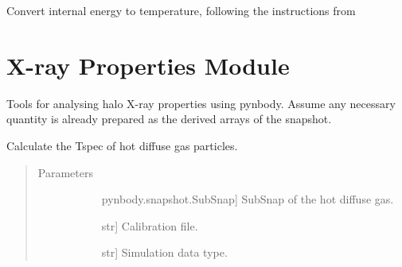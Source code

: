 \documentclass[letterpaper,10pt,english]{sphinxmanual}
\begin{document}

\begin{fulllineitems}
\label{\detokenize{gas_properties:modules.gas_properties.temp}}
Convert internal energy to temperature, following 
the instructions from 

\end{fulllineitems}



\section{X-ray Properties Module}
\label{\detokenize{X_properties:module-modules.X_properties}}\label{\detokenize{X_properties:x-ray-properties-module}}\label{\detokenize{X_properties::doc}}
Tools for analysing halo X-ray properties using pynbody.
Assume any necessary quantity is already prepared as 
the derived arrays of the snapshot.

\begin{fulllineitems}
\label{\detokenize{X_properties:modules.X_properties.cal_tspec}}
Calculate the Tspec of hot diffuse gas particles.
\begin{quote}\begin{description}
\item[{Parameters}] \leavevmode\begin{description}
\item[{}] \leavevmode{[}pynbody.snapshot.SubSnap{]}
SubSnap of the hot diffuse gas.

\item[{}] \leavevmode{[}str{]}
Calibration file.

\item[{}] \leavevmode{[}str{]}
Simulation data type.

\end{description}

\end{description}\end{quote}

\end{fulllineitems}
\end{document}
